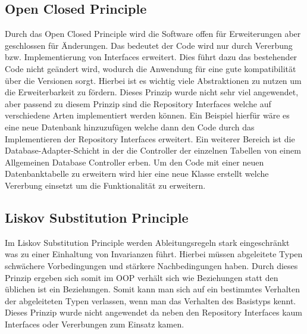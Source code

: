 \subsection{Open Closed Principle}
Durch das Open Closed Principle wird die Software offen für Erweiterungen aber geschlossen für Änderungen.
Das bedeutet der Code wird nur durch Vererbung bzw. Implementierung von Interfaces erweitert.
Dies führt dazu das bestehender Code nicht geändert wird, wodurch die Anwendung für eine gute kompatibilität über die Versionen sorgt.
Hierbei ist es wichtig viele Abstraktionen zu nutzen um die Erweiterbarkeit zu fördern.
Dieses Prinzip wurde nicht sehr viel angewendet, aber passend zu diesem Prinzip sind die Repository Interfaces welche auf verschiedene Arten implementiert werden können.
Ein Beispiel hierfür wäre es eine neue Datenbank hinzuzufügen welche dann den Code durch das Implementieren der Repository Interfaces erweitert.
Ein weiterer Bereich ist die Database-Adapter-Schicht in der die Controller der einzelnen Tabellen von einem Allgemeinen Database Controller erben.
Um den Code mit einer neuen Datenbanktabelle zu erweitern wird hier eine neue Klasse erstellt welche Vererbung einsetzt um die Funktionalität zu erweitern.


\subsection{Liskov Substitution Principle}
Im Liskov Substitution Principle werden Ableitungsregeln stark eingeschränkt was zu einer Einhaltung von Invarianzen führt.
Hierbei müssen abgeleitete Typen schwächere Vorbedingungen und stärkere Nachbedingungen haben.
Durch dieses Prinzip ergeben sich somit im OOP \glqq verhält sich wie\grqq{} Beziehungen statt den üblichen \glqq ist ein\grqq{} Beziehungen.
Somit kann man sich auf ein bestimmtes Verhalten der abgeleiteten Typen verlassen, wenn man das Verhalten des Basistyps kennt.
Dieses Prinzip wurde nicht angewendet da neben den Repository Interfaces kaum Interfaces oder Vererbungen zum Einsatz kamen.

